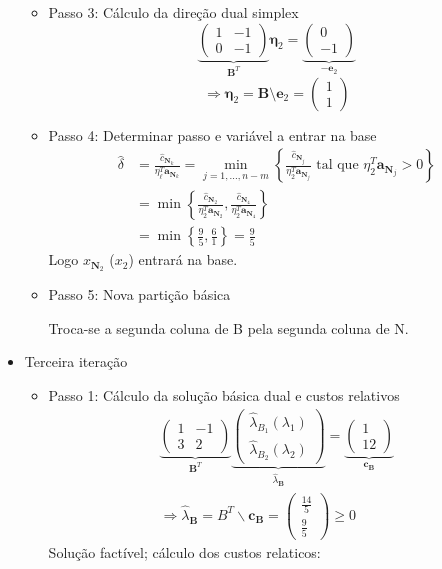 \documentclass{article}
\begin{document}
\begin{itemize}
\begin{itemize}
		\item Passo 3: Cálculo da direção dual simplex
\[
\underbrace{
\begin{pmatrix}
1&-1\\
0&-1
\end{pmatrix}}_{\mathbf{B}^T}
\mathbf{\eta}_2
=
\underbrace{
\begin{pmatrix}
0\\
-1
\end{pmatrix}}_{-\mathbf{e}_2}
\]
\[
\Rightarrow \mathbf{\eta}_2 = \mathbf{B} \setminus \mathbf{e}_2 =
\begin{pmatrix}
1\\
1
\end{pmatrix}
\]
		\item Passo 4: Determinar passo e variável a entrar na base
\begin{align*}
\widehat{\delta}&=\frac{\widehat{c}_{\mathbf{N}_k}}{\eta_\ell^T \mathbf{a}_{\mathbf{N}_k}}
=\min_{j=1,...,n-m}\left\{\frac{\widehat{c}_{\mathbf{N}_j}}{\eta_2^T \mathbf{a}_{\mathbf{N}_j}} \text { tal que } \eta_2^T \mathbf{a}_{\mathbf{N}_j}>0\right\}\\
&=\min \left\{
\frac{\widehat{c}_{\mathbf{N}_2}}{\eta_{2}^T \mathbf{a}_{\mathbf{N}_2}}, \frac{\widehat{c}_{\mathbf{N}_4}}{\eta_{2}^T \mathbf{a}_{\mathbf{N}_4}}
\right\}\\
&=\min \left\{
\frac{9}{5}, \frac{6}{1}
\right\}=\frac{9}{5}
\end{align*}
Logo $x_{\mathbf{N}_2}$ ($x_2$) entrará na base.
		\item Passo 5: Nova partição básica

Troca-se a segunda coluna de B pela segunda coluna de N.
	\end{itemize}
	\item Terceira iteração
	\begin{itemize}
\item Passo 1: Cálculo da solução básica dual e custos relativos
$$
\begin{gathered}
\underbrace{\left(\begin{array}{cc}
1 & -1 \\
3 & 2
\end{array}\right)}_{\mathbf{B}^{T}} \underbrace{\left(\begin{array}{l}
\hat{\lambda}_{B_{1}}\left(\lambda_{1}\right) \\
\hat{\lambda}_{B_{2}}\left(\lambda_{2}\right)
\end{array}\right)}_{\hat{\lambda}_{\mathbf{B}}}=\underbrace{\left(\begin{array}{l}
1 \\
12
\end{array}\right)}_{\mathbf{c}_{\mathbf{B}}} \\
\Rightarrow \hat{\lambda}_{\mathbf{B}}=B^{T} \backslash \mathbf{c}_{\mathbf{B}}=\left(\begin{array}{l}
\frac{14}{5} \\
\frac{9}{5}
\end{array}\right) \geq 0
\end{gathered}
$$
Solução factível; cálculo dos custos relaticos: 


\end{itemize}
\end{itemize}
\end{document}

